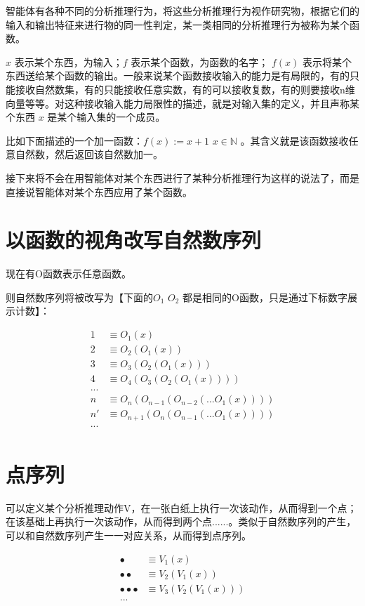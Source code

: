 \documentclass[12pt,oneside]{book}
\begin{document}
智能体有各种不同的分析推理行为，将这些分析推理行为视作研究物，根据它们的输入和输出特征来进行物的同一性判定，某一类相同的分析推理行为被称为某个函数。

$x$ 表示某个东西，为输入；$f$ 表示某个函数，为函数的名字； $f(x)$ 表示将某个东西送给某个函数的输出。一般来说某个函数接收输入的能力是有局限的，有的只能接收自然数集，有的只能接收任意实数，有的可以接收复数，有的则要接收n维向量等等。对这种接收输入能力局限性的描述，就是对输入集的定义，并且声称某个东西 $x$ 是某个输入集的一个成员。

比如下面描述的一个加一函数：$f(x) := x +1$ $ x \in \mathbb{N} $ 。其含义就是该函数接收任意自然数，然后返回该自然数加一。

接下来将不会在用智能体对某个东西进行了某种分析推理行为这样的说法了，而是直接说智能体对某个东西应用了某个函数。


\section{以函数的视角改写自然数序列}
现在有O函数表示任意函数。

则自然数序列将被改写为【下面的$O_1$ $O_2$ 都是相同的O函数，只是通过下标数字展示计数】：

\begin{align*}
1 &\equiv O_1(x) \\
2 &\equiv O_2(O_1(x)) \\
3 &\equiv O_3(O_2(O_1(x))) \\
4 &\equiv O_4(O_3(O_2(O_1(x)))) \\
...\\
n &\equiv O_n(O_{n-1}(O_{n-2}(...O_1(x)))) \\
n' &\equiv O_{n+1}(O_n(O_{n-1}(...O_1(x))))\\
...\\
\end{align*}

\section{点序列}
可以定义某个分析推理动作V，在一张白纸上执行一次该动作，从而得到一个点；在该基础上再执行一次该动作，从而得到两个点......。类似于自然数序列的产生，可以和自然数序列产生一一对应关系，从而得到点序列。


\begin{align*}
\bullet &\equiv V_1(x) \\
\bullet \bullet&\equiv V_2(V_1(x)) \\
\bullet \bullet \bullet &\equiv V_3(V_2(V_1(x))) \\
...\\
\end{align*}
\end{document}
